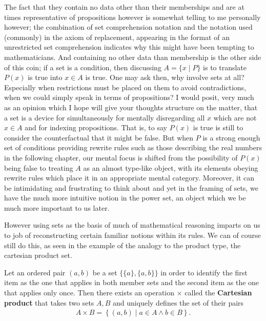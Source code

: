 \documentclass[11pt]{article}
\begin{document}
The fact that they contain no data other than their memberships and are at times representative of propositions however is somewhat telling to me personally however; the combination of set comprehension notation and the notation used (commonly) in the axiom of replacement, appearing in the format of an unrestricted set comprehension indicates why this might have been tempting to mathematicians. And containing no other data than membership is the other side of this coin; if a set is a condition, then discussing $A = \{x \mid P\}$ is to translate $P(x)$ is true into $x \in A$ is true. One may ask then, why involve sets at all? Especially when restrictions must be placed on them to avoid contradictions, when we could simply speak in terms of propositions? I would posit, very much as an opinion which I hope will give your thoughts structure on the matter, that a set is a device for simultaneously for mentally disregarding all $x$ which are not $x \in A$ and for indexing propositions. That is, to say $P(x)$ is true is still to consider the counterfactual that it might be false. But when $P$ is a strong enough set of conditions providing rewrite rules such as those describing the real numbers in the following chapter, our mental focus is shifted from the possibility of $P(x)$ being false to treating $A$ as an almost type-like object, with its elements obeying rewrite rules which place it in an appropriate mental category. Moreover, it can be intimidating and frustrating to think about  and yet in the framing of sets, we have the much more intuitive  notion in the power set, an object which we be much more important to us later.

However using sets as the basis of much of mathematical reasoning imparts on us to job of reconstructing certain familiar notions within its rules. We can of course still do this, as seen in the example of the analogy to the product type, the cartesian product set.

\begin{theorem}
Let an ordered pair $(a,b)$ be a set $\{\{a\},\{a,b\}\}$ in order to identify the first item as the one that applies in both member sets and the second item as the one that applies only once. Then there exists an operation $\times$ called the \textbf{Cartesian product} that takes two sets $A,B$ and uniquely defines the set of their pairs \begin{gather*}
A \times B = \left\{ (a,b) \mid a \in A \wedge b \in B \right\}.
\end{gather*}
\end{theorem}
\end{document}
